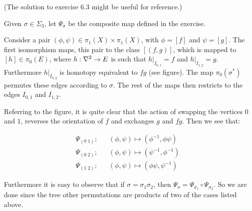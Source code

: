 \documentclass[a4paper,11pt,english]{article}
\begin{document}
\begin{exercise}[3](The solution to exercise 6.3 might be useful for reference.)

Given $\sigma \in \Sigma_3$, let $\Psi_\sigma$ be the composite map defined in
the exercise. 

Consider a pair $(\phi,\psi) \in \pi_1(X) \times \pi_1(X)$, with $\phi=[f]$ and $\psi=[g]$. The first isomorphism maps, this pair to the class $[(f,g)]$, which is mapped to $[h] \in \pi_0(E)$, where $h: \nabla^2 \to E$ is such that $h |_{I_{0,1}} = f$ and $h |_{I_{1,2}} = g$. Furthermore $h|_{I_{0,2}}$ is homotopy equivalent to $fg$ (see figure). The map $\pi_0(\sigma^*)$ permutes these edges according to $\sigma$. The rest of the maps then restricts to the edges $I_{0,1}$ and $I_{1,2}$. 

\begin{figure}[h]
\centering

\caption{}
\label{fig:my_label}
\end{figure}

Referring to the figure, it is quite clear that the action of swapping the vertices $0$ and $1$, reverses the orientation of $f$ and exchanges $g$ and $fg$. Then we see that:

\begin{eqnarray*}
\Psi_{(0\; 1)};&& (\phi, \psi) \mapsto (\phi^{-1}, \phi \psi) \\
\Psi_{(0\; 2)};&& (\phi, \psi) \mapsto (\psi^{-1}, \phi^{-1}) \\
\Psi_{(1\; 2)};&& (\phi, \psi) \mapsto (\phi\psi, \psi^{-1})
\end{eqnarray*}

Furthermore it is easy to observe that if $\sigma = \sigma_1 \sigma_2$, then $\Psi_\sigma = \Psi_{\sigma_1} \circ \Psi_{\sigma_2}$. So we are done since the tree other permutations are products of two of the cases listed above.
\end{exercise}
\end{document}
